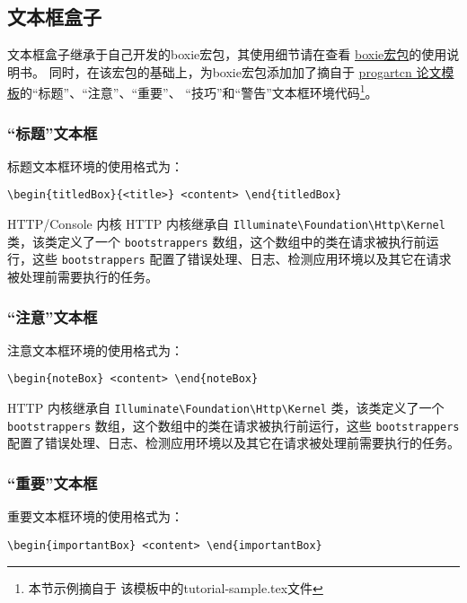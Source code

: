 \documentclass[
  ]{nwafuprojrep}
\begin{document}
\subsection{文本框盒子}
文本框盒子继承于自己开发的boxie宏包，其使用细节请在\github{}查看
\href{https://github.com/registor/boxiesty}{boxie宏包}的使用说明书。
同时，在该宏包的基础上，为boxie宏包添加加了摘自于
\href{https://github.com/WisdomFusion/latex-templates/tree/master/progartcn}{progartcn
  论文模板}的\enquote{标题}、\enquote{注意}、\enquote{重要}、
\enquote{技巧}和\enquote{警告}文本框环境代码\footnote{本节示例摘自于
  该模板中的tutorial-sample.tex文件}。
\subsubsection{\enquote{标题}文本框}
标题文本框环境的使用格式为：

\verb|\begin{titledBox}{<title>} <content> \end{titledBox}|

\begin{titledBox}{HTTP/Console 内核}
  HTTP 内核继承自 \verb|Illuminate\Foundation\Http\Kernel| 类，该类定义了一个 \verb|bootstrappers| 数组，这个数组中的类在请求被执行前运行，这些 \verb|bootstrappers| 配置了错误处理、日志、检测应用环境以及其它在请求被处理前需要执行的任务。
\end{titledBox}
\subsubsection{\enquote{注意}文本框}
注意文本框环境的使用格式为：

\verb|\begin{noteBox} <content> \end{noteBox}|

\begin{noteBox}
  HTTP 内核继承自 \verb|Illuminate\Foundation\Http\Kernel| 类，该类定义了一个 \verb|bootstrappers| 数组，这个数组中的类在请求被执行前运行，这些 \verb|bootstrappers| 配置了错误处理、日志、检测应用环境以及其它在请求被处理前需要执行的任务。
\end{noteBox}

\subsubsection{\enquote{重要}文本框}
重要文本框环境的使用格式为：

\verb|\begin{importantBox} <content> \end{importantBox}|
\end{document}
